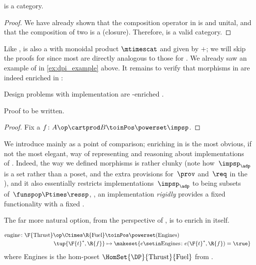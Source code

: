 \begin{lemma}
    \label{lem:DPI-is-category}
    \DPI is a category.
\end{lemma}

\begin{proof}
    We have already shown that the composition operator in \DPI is  and unital, and that the composition of two  is a  (closure).
    Therefore, \DPI is a valid category.
\end{proof}

Like \DP, \DPI is also a  with monoidal product $\mtimescat$ and  given by $+$;
we will skip the proofs for \DPI since most are directly analogous to those for \DP.
We already saw an example of \DPI in \cref{ex:dpi_example} above.
It remains to verify that morphisms in \DPI are indeed enriched in \Set:

\begin{proposition}\label{prop:dps-are-enriched}
    Design problems with implementation are \Set-enriched .
\end{proposition}
\begin{publictodo}
    Proof to be written.
\end{publictodo}

\begin{proof}
        Fix a  $f \colon A\op \cartprod B \toinPos \powerset \impsp$.
 \end{proof}


We introduce \DPI mainly as a point of comparison; enriching in \Set is the most obvious, if not the most elegant, way of representing and reasoning about implementations of .
Indeed, the way we defined morphisms is rather clunky (note how~$\impsp_\adp$ is a set rather than a poset, and the extra provisions for~$\prov$ and~$\req$ in the ), and it also essentially restricts implementations~$\impsp_\adp$ to being subsets of~$\funspop \Ptimes \ressp$, \ie, an implementation \emph{rigidly} provides a fixed functionality \fun with a fixed \res.

The far more natural option, from the perspective of , is to enrich  in \DP itself.

\begin{example}
    \begin{equation}
        \begin{aligned}
            \text{engine} \colon \F{\text{Thrust}}\op \Ctimes \R{\text{Fuel}} & \toinPos \powerset(\text{Engines}) \\
            \tup{\F{t}^*,\R{f}}                                               & \mapsto \makeset{ e \setin \text{Engines} \colon e(\F{t}^*, \R{f}) = \true }
        \end{aligned}
    \end{equation}
    where Engines is the hom-poset $\HomSet{\DP}{\text{Thrust}}{\text{Fuel}}$ from \XXX. %
\end{example}

